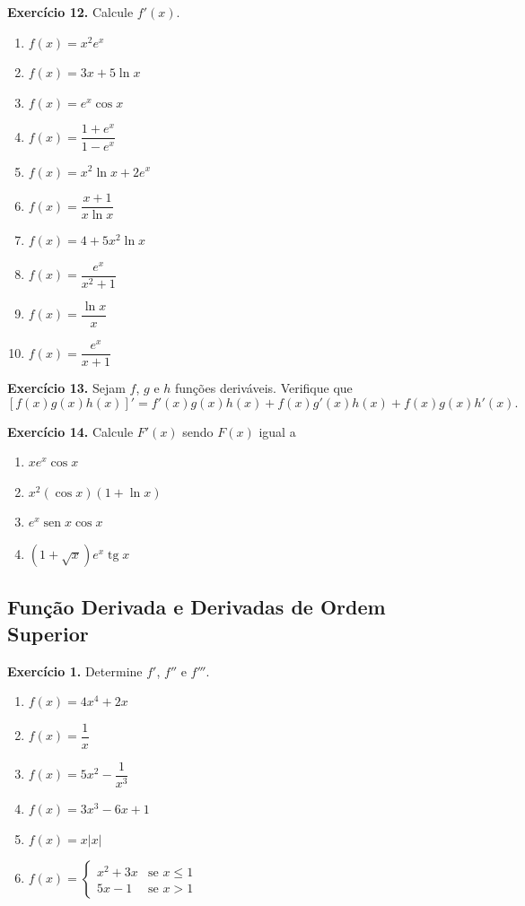 \documentclass[12pt,a4paper]{article}
\begin{document}
\vspace{0.5cm}
\noindent\textbf{Exercício 12.} Calcule $f'(x)$.
\begin{enumerate}
    \renewcommand{\theenumi}{\alph{enumi}}
    \renewcommand{\labelenumi}{\theenumi)}
    \item $f(x) = x^2 e^x$
    \item $f(x) = 3x + 5\ln x$
    \item $f(x) = e^x \cos x$
    \item $f(x) = \dfrac{1 + e^x}{1 - e^x}$
    \item $f(x) = x^2 \ln x + 2e^x$
    \item $f(x) = \dfrac{x + 1}{x\ln x}$
    \item $f(x) = 4 + 5x^2 \ln x$
    \item $f(x) = \dfrac{e^x}{x^2 + 1}$
    \item $f(x) = \dfrac{\ln x}{x}$
    \item $f(x) = \dfrac{e^x}{x + 1}$
\end{enumerate}

\vspace{0.5cm}
\noindent\textbf{Exercício 13.}
Sejam $f$, $g$ e $h$ funções deriváveis. Verifique que
\[
[f(x)g(x)h(x)]' = f'(x)g(x)h(x) + f(x)g'(x)h(x) + f(x)g(x)h'(x).
\]

\vspace{0.5cm}
\noindent\textbf{Exercício 14.} Calcule $F'(x)$ sendo $F(x)$ igual a
\begin{enumerate}
    \renewcommand{\theenumi}{\alph{enumi}}
    \renewcommand{\labelenumi}{\theenumi)}
    \item $x e^x \cos x$
    \item $x^2 (\cos x)(1 + \ln x)$
    \item $e^x \operatorname{sen} x \cos x$
    \item $(1 + \sqrt{x})e^x \operatorname{tg} x$
\end{enumerate}

\subsection{Função Derivada e Derivadas de Ordem Superior}
\vspace{0.5cm}
\noindent\textbf{Exercício 1.} Determine $f'$, $f''$ e $f'''$.
\begin{enumerate}
    \renewcommand{\theenumi}{\alph{enumi}}
    \renewcommand{\labelenumi}{\theenumi)}
    \item $f(x) = 4x^4 + 2x$
    \item $f(x) = \dfrac{1}{x}$
    \item $f(x) = 5x^2 - \dfrac{1}{x^3}$
    \item $f(x) = 3x^3 - 6x + 1$
    \item $f(x) = x|x|$
    \item $f(x) = \begin{cases} x^2 + 3x & \text{se } x \le 1 \\ 5x - 1 & \text{se } x > 1 \end{cases}$
\end{enumerate}
\end{document}
